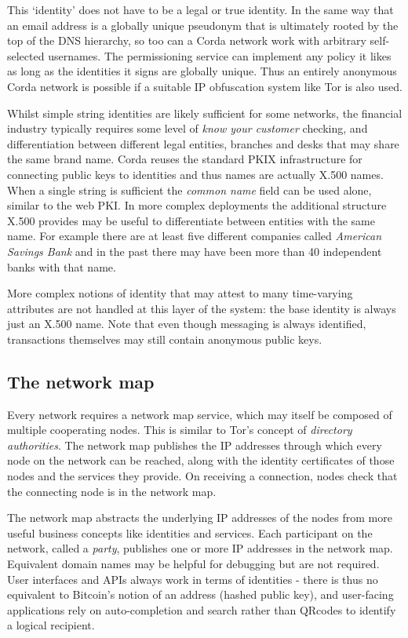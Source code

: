 \documentclass{article}
\begin{document}
This `identity' does not have to be a legal or true identity. In the same way that an email address is a globally
unique pseudonym that is ultimately rooted by the top of the DNS hierarchy, so too can a Corda network work with
arbitrary self-selected usernames. The permissioning service can implement any policy it likes as long as the
identities it signs are globally unique. Thus an entirely anonymous Corda network is possible if a suitable
IP obfuscation system like Tor is also used.

Whilst simple string identities are likely sufficient for some networks, the financial industry typically requires some
level of \emph{know your customer} checking, and differentiation between different legal entities, branches and desks
that may share the same brand name. Corda reuses the standard PKIX infrastructure for connecting public keys to
identities and thus names are actually X.500 names. When a single string is sufficient the \emph{common name} field can
be used alone, similar to the web PKI. In more complex deployments the additional structure X.500 provides may be useful
to differentiate between entities with the same name. For example there are at least five different companies called
\emph{American Savings Bank} and in the past there may have been more than 40 independent banks with that name.

More complex notions of identity that may attest to many time-varying attributes are not handled at this layer of the
system: the base identity is always just an X.500 name. Note that even though messaging is always identified, transactions
themselves may still contain anonymous public keys.


\subsection{The network map}

Every network requires a network map service, which may itself be composed of multiple cooperating nodes. This is
similar to Tor's concept of \emph{directory authorities}. The network map publishes the IP addresses through which
every node on the network can be reached, along with the identity certificates of those nodes and the services they
provide. On receiving a connection, nodes check that the connecting node is in the network map.

The network map abstracts the underlying IP addresses of the nodes from more useful business concepts like identities
and services. Each participant on the network, called a \emph{party}, publishes one or more IP addresses in the
network map. Equivalent domain names may be helpful for debugging but are not required. User interfaces and APIs
always work in terms of identities - there is thus no equivalent to Bitcoin's notion of an address (hashed public key),
and user-facing applications rely on auto-completion and search rather than QRcodes to identify a logical recipient.
\end{document}
